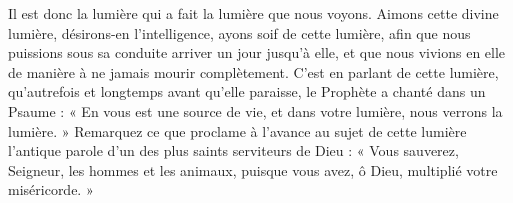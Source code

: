 Il est donc la lumière qui a fait la lumière que nous voyons. Aimons cette divine lumière, désirons-en l’intelligence, ayons soif de cette lumière, afin que nous puissions sous sa conduite arriver un jour jusqu’à elle, et que nous vivions en elle de manière à ne jamais mourir complètement. C’est en parlant de cette lumière, qu’autrefois et longtemps avant qu’elle paraisse, le Prophète a chanté dans un Psaume : « En vous est une source de vie, et dans votre lumière, nous verrons la lumière. » Remarquez ce que proclame à l’avance au sujet de cette lumière l’antique parole d’un des plus saints serviteurs de Dieu : « Vous sauverez, Seigneur, les hommes et les animaux, puisque vous avez, ô Dieu, multiplié votre miséricorde. »
